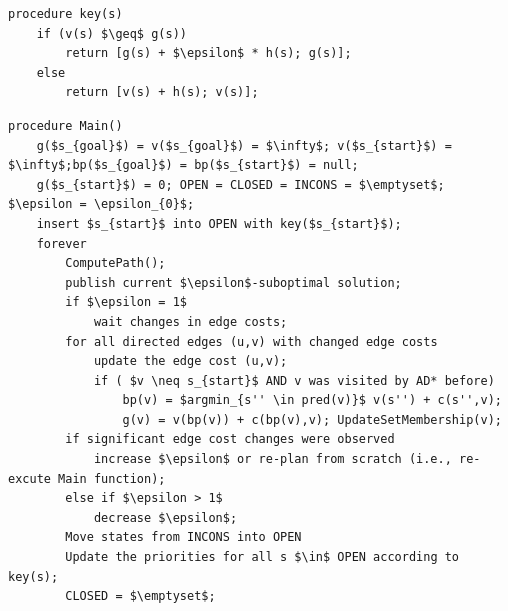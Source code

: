 \begin{lstlisting}[mathescape, label=lst-dinamicos-ad-key, caption=Algoritmo AD* - função da chave ordenadora da fila de prioridades, float=htpb]
procedure key(s)
	if (v(s) $\geq$ g(s))
		return [g(s) + $\epsilon$ * h(s); g(s)];
	else
		return [v(s) + h(s); v(s)];
\end{lstlisting}

\begin{lstlisting}[mathescape, label=lst-dinamicos-ad-main, caption=Algoritmo AD* - função principal, float=htpb]
procedure Main()
	g($s_{goal}$) = v($s_{goal}$) = $\infty$; v($s_{start}$) = $\infty$;bp($s_{goal}$) = bp($s_{start}$) = null;
	g($s_{start}$) = 0; OPEN = CLOSED = INCONS = $\emptyset$; $\epsilon = \epsilon_{0}$;
	insert $s_{start}$ into OPEN with key($s_{start}$);
	forever
		ComputePath();
		publish current $\epsilon$-suboptimal solution;
		if $\epsilon = 1$
			wait changes in edge costs;
		for all directed edges (u,v) with changed edge costs
			update the edge cost (u,v);
			if ( $v \neq s_{start}$ AND v was visited by AD* before)
				bp(v) = $argmin_{s'' \in pred(v)}$ v(s'') + c(s'',v);
				g(v) = v(bp(v)) + c(bp(v),v); UpdateSetMembership(v);
		if significant edge cost changes were observed
			increase $\epsilon$ or re-plan from scratch (i.e., re-excute Main function);
		else if $\epsilon > 1$
			decrease $\epsilon$;
		Move states from INCONS into OPEN
		Update the priorities for all s $\in$ OPEN according to key(s);
		CLOSED = $\emptyset$;
\end{lstlisting}